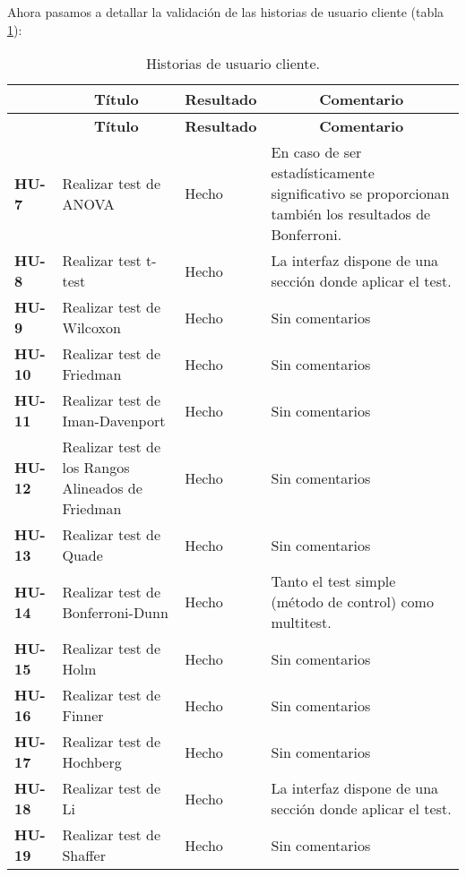 Ahora pasamos a detallar la validación de las historias de usuario cliente (tabla \ref{validacionhuc}):

\begin{center}
\setlength{\belowcaptionskip}{0.5cm}
\begin{longtable}[H]{| p{2cm} | p{4.25cm} | p{1cm} | p{5cm} |}
	\hline
	\rowcolor{Gray}
	\multicolumn{1}{|c|}{\textbf{H. Usuario}} & \multicolumn{1}{|c|}{\textbf{Título}} & \multicolumn{1}{|c|}{\textbf{Resultado}} & \multicolumn{1}{|c|}{\textbf{Comentario}} \\ \hline
	\endfirsthead
	\hline
	\rowcolor{Gray}
	\multicolumn{1}{|c|}{\textbf{H. Usuario}} & \multicolumn{1}{|c|}{\textbf{Título}} & \multicolumn{1}{|c|}{\textbf{Resultado}} & \multicolumn{1}{|c|}{\textbf{Comentario}} \\ \hline
	\endhead
	\caption{Historias de usuario cliente.}
	\label{validacionhuc}
	\endfoot
	\textbf{HU-7} & Realizar test de ANOVA & Hecho & En caso de ser estadísticamente significativo se proporcionan también los resultados de Bonferroni. \\ \hline
	\textbf{HU-8} & Realizar test t-test & Hecho & La interfaz dispone de una sección donde aplicar el test. \\ \hline
	\textbf{HU-9} & Realizar test de Wilcoxon & Hecho & Sin comentarios \\ \hline
	\textbf{HU-10} & Realizar test de Friedman & Hecho & Sin comentarios \\ \hline
	\textbf{HU-11} & Realizar test de Iman-Davenport & Hecho & Sin comentarios \\ \hline
	\textbf{HU-12} & Realizar test de los Rangos Alineados de Friedman & Hecho & Sin comentarios \\ \hline
	\textbf{HU-13} & Realizar test de Quade & Hecho & Sin comentarios \\ \hline
	\textbf{HU-14} & Realizar test de Bonferroni-Dunn & Hecho & Tanto el test simple (método de control) como multitest. \\ \hline
	\textbf{HU-15} & Realizar test de Holm & Hecho & Sin comentarios \\ \hline
	\textbf{HU-16} & Realizar test de Finner & Hecho & Sin comentarios \\ \hline
	\textbf{HU-17} & Realizar test de Hochberg & Hecho & Sin comentarios \\ \hline
	\textbf{HU-18} & Realizar test de Li & Hecho & La interfaz dispone de una sección donde aplicar el test. \\ \hline
	\textbf{HU-19} & Realizar test de Shaffer & Hecho & Sin comentarios \\ \hline

\end{longtable}
\end{center}
